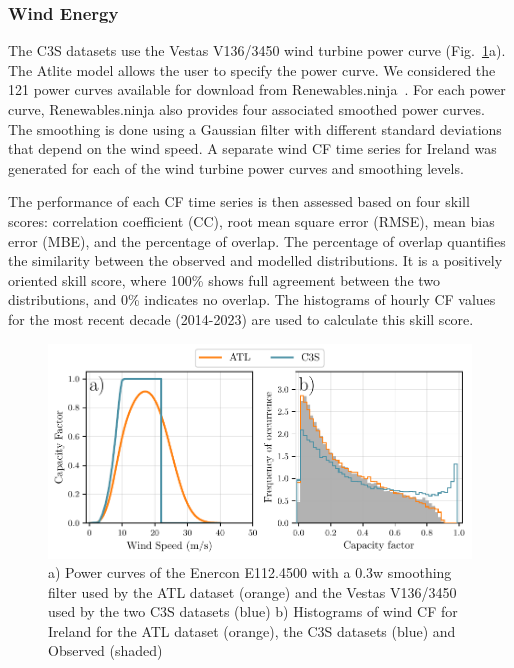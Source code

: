 \documentclass[preprint, 12pt]{elsarticle}
\begin{document}
\subsubsection{Wind Energy}
\label{sec:wind_verification}

The C3S datasets use the Vestas V136/3450 wind turbine power curve (Fig.~\ref{fig:power_curve}a). The Atlite model allows the user to specify the power curve. We considered the 121 power curves available for download from Renewables.ninja~\citep{staffell2016wake}. For each power curve, Renewables.ninja also provides four associated smoothed power curves. The smoothing is done using a Gaussian filter with different standard deviations that depend on the wind speed. A separate wind CF time series for Ireland was generated for each of the wind turbine power curves and smoothing levels.

The performance of each CF time series is then assessed based on four skill scores: correlation coefficient (CC), root mean square error (RMSE), mean bias error (MBE), and the percentage of overlap. The percentage of overlap quantifies the similarity between the observed and modelled distributions. It is a positively oriented skill score, where 100\% shows full agreement between the two distributions, and 0\% indicates no overlap. The histograms of hourly CF values for the most recent decade (2014-2023) are used to calculate this skill score.

\begin{figure}[!ht]
	\centering
	\includegraphics[width=\textwidth]{verification_power_curve.pdf}
	\caption{a) Power curves of the Enercon E112.4500 with a 0.3w smoothing filter used by the ATL dataset (orange) and the Vestas V136/3450 used by the two C3S datasets (blue) b) Histograms of wind CF for Ireland for the ATL dataset (orange), the C3S datasets (blue) and Observed (shaded)}
	\label{fig:power_curve}
\end{figure}
\end{document}
